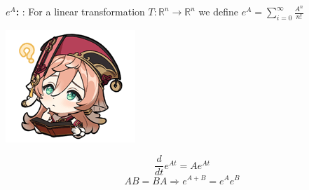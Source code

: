 \documentclass{tufte-book}
\begin{document}
\begin{tcolorbox}[colback=red!5!white]
	\textbf{$e^A$: }: For a linear transformation $T:\mathbb R^n\to\mathbb R^n$ we define $e^A=\sum_{i=0}^\infty \frac{A^n}{n!}$
\end{tcolorbox}
\begin{marginfigure}
	\includegraphics{6.png}
\end{marginfigure}
\begin{tcolorbox}[colback=blue!8!white]
	$$\frac{d}{dt}e^{At}=Ae^{At}$$
	$$AB=BA\Rightarrow e^{A+B}=e^Ae^B$$
\end{tcolorbox}
\end{document}
